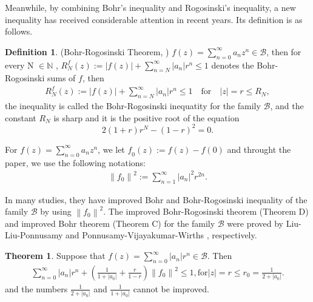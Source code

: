 \documentclass{birkjour}
\theoremstyle{plain}
\theoremstyle{definition}
\newtheorem{defn}{Definition}
\theoremstyle{definition}
\newtheorem{theorem}{Theorem}
\begin{document}
 Meanwhile, by combining Bohr's inequality and Rogosinski's inequality, a new inequality has received considerable attention in recent years. Its definition is as follows.

\begin{defn}(Bohr-Rogosinski Theorem, \cite{ref28})
	$\mathit{f}(z)=\sum_{n=0}^{\infty}a_{n}z^{n}  \in \mathcal{B}$, then for every N $\in \mathbb{N}$ , $\mathit{R}_{N}^{f}(z) :=\left| \mathit{f}(z) \right| + \sum_{n=N}^{\infty} \left| a_{n} \right| r^{n}  \le 1 $ denotes the Bohr-Rogosinski sums of $\mathit{f}$, then
	\begin{align*}
		\mathit{R}_{N}^{f}(z) :=\left| f(z) \right| + \sum_{n=N}^{\infty} \left| a_n \right| r^{n}  \le 1\quad
		\text{for}\quad \left| z \right|=r \le R_N,
	\end{align*}
	the inequality is called the Bohr-Rogosinski inequatity for the family $\mathcal{B}$, and the constant $R_N$ is sharp and it is the positive root of the equation
	\begin{equation*}
		2(1+r)r^N-(1-r)^2=0.
	\end{equation*}
\end{defn}
For $\mathit{f}(z)=\sum_{n=0}^{\infty } a_nz^n$, we let $\mathit{f}_0(z):=\mathit f(z)-\mathit f(0)$ and throught the paper, we use the following notations:
\begin{align*}
	\left \| f_0 \right \| ^ 2:=\sum_{n=1}^{\infty } \left | a_n \right | ^2r^{2n}.
\end{align*}

In many studies, they have improved Bohr and Bohr-Rogosinski inequality of the family $\mathcal{B}$ by using $\left \| f_0 \right \| ^ 2$. The improved Bohr-Rogosinski theorem (Theorem D) and improved Bohr theorem (Theorem C) for the family $\mathcal{B}$ were proved by Liu-Liu-Ponnusamy \cite{ref32} and Ponnusamy-Vijayakumar-Wirths \cite{ref35}, respectively.


\begin{theorem}\cite{ref35}
	Suppose that $\mathit{f}(z)=\sum_{n=0}^{\infty} \left| a_{n} \right| r^{n} \in \mathcal{B}$. Then
	\begin{align*}
		\sum_{n=0}^{\infty} \left| a_n \right| r^{n} +(\frac{1}{1+\left | a_0 \right | } +\frac{r}{1-r} )\left \| f_0 \right \| ^ 2 \le 1, \text{for} \left| z \right | =r \le r_0=\frac{1}{2+\left | a_0 \right |}.
	\end{align*}
	and the numbers $\frac{1}{2+\left | a_0 \right |}$ and $\frac{1}{1+\left | a_0 \right |}$ cannot be improved.
\end{theorem}
\end{document}
